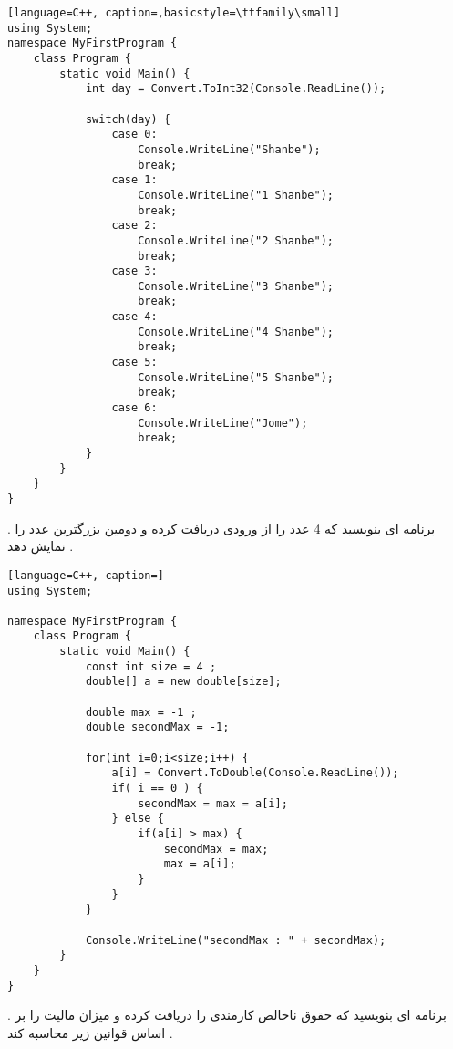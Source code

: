 \documentclass[12pt]{article}
\begin{document}
\begin{latin}
\begin{lstlisting}[language=C++, caption=,basicstyle=\ttfamily\small]
using System;
namespace MyFirstProgram {
	class Program {
		static void Main() {
			int day = Convert.ToInt32(Console.ReadLine());
			
			switch(day) {
				case 0:
					Console.WriteLine("Shanbe");
					break;
				case 1:
					Console.WriteLine("1 Shanbe");
					break;
				case 2:
					Console.WriteLine("2 Shanbe");
					break;
				case 3:
					Console.WriteLine("3 Shanbe");
					break;
				case 4:
					Console.WriteLine("4 Shanbe");
					break;
				case 5:
					Console.WriteLine("5 Shanbe");
					break;
				case 6:
					Console.WriteLine("Jome");
					break;
			}
		}
	}
}
\end{lstlisting}
\end{latin}







\newpage

 . برنامه ای بنویسید که 4 عدد را از ورودی دریافت کرده و دومین بزرگترین عدد را نمایش دهد .








\begin{latin}
\begin{lstlisting}[language=C++, caption=]
using System;

namespace MyFirstProgram {
	class Program {
		static void Main() {
			const int size = 4 ;
			double[] a = new double[size];
			
			double max = -1 ;
			double secondMax = -1;
			
			for(int i=0;i<size;i++) {
				a[i] = Convert.ToDouble(Console.ReadLine());
				if( i == 0 ) {
					secondMax = max = a[i];
				} else {
					if(a[i] > max) {
						secondMax = max;
						max = a[i];
					}
				}
			}
	
			Console.WriteLine("secondMax : " + secondMax);
		}
	}
}
\end{lstlisting}
\end{latin}








\newpage

 . برنامه ای بنویسید که حقوق ناخالص کارمندی را دریافت کرده و میزان مالیت را بر اساس قوانین زیر محاسبه کند .
\end{document}
